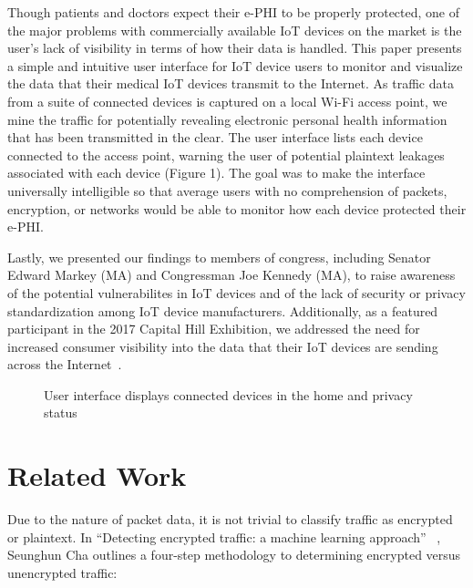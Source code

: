 Though patients and doctors expect their e-PHI to be properly protected, one of the major problems with commercially available IoT devices on the market is the user's lack of visibility in terms of how their data is handled. This paper presents a simple and intuitive user interface for IoT device users to monitor and visualize the data that their medical IoT devices transmit to the Internet. As traffic data from a suite of connected devices is captured on a local Wi-Fi access point, we mine the traffic for potentially revealing electronic personal health information that has been transmitted in the clear. The user interface lists each device connected to the access point, warning the user of potential plaintext leakages associated with each device (Figure 1). The goal was to make the interface universally intelligible so that average users with no comprehension of packets, encryption, or networks would be able to monitor how each device protected their e-PHI.

Lastly, we presented our findings to members of congress, including Senator Edward Markey (MA) and Congressman Joe Kennedy (MA), to raise awareness of the potential vulnerabilites in IoT devices and of the lack of security or privacy standardization among IoT device manufacturers. Additionally, as a featured participant in the 2017 Capital Hill Exhibition, we addressed the need for increased consumer visibility into the data that their IoT devices are sending across the Internet~\cite{cra}.

\begin{figure}
  \centering
  \caption{User interface displays connected devices in the home and privacy status}
  \label{fig:dashboard}
\end{figure}

\section{Related Work}
Due to the nature of packet data, it is not trivial to classify traffic as encrypted or plaintext. In ``Detecting encrypted traffic: a machine learning approach'' ~\cite{chaMachineLearning}, Seunghun Cha outlines a four-step methodology to determining encrypted versus unencrypted traffic:

